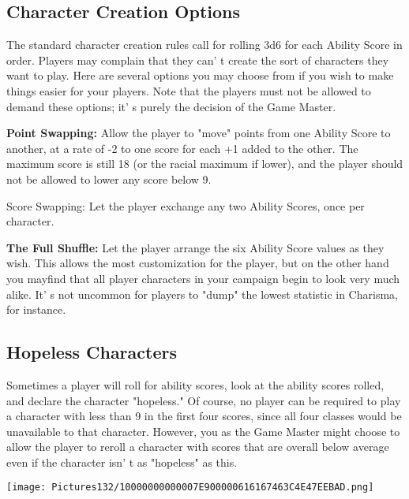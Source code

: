\documentclass[a4paper,twoside,openany,10pt]{book}
\begin{document}
\begin{multicols}{2}


\subsection{Character Creation Options}\label{character-creation-options}

The standard character creation rules call for rolling 3d6 for each Ability Score in order. Players may complain that they can' t create the sort of characters they want to play. Here are several options you may choose from if you wish to make things easier for your players. Note that the players must not be allowed to demand these options; it' s purely the decision of the Game Master.

\textbf{Point Swapping:} Allow the player to "move" points from one Ability Score to another, at a rate of -2 to one score for each +1 added to the other. The maximum score is still 18 (or the racial maximum if lower), and the player should not be allowed to lower any score below 9. 

Score Swapping: Let the player exchange any two Ability Scores, once per character.

\textbf{The Full Shuffle:} Let the player arrange the six Ability Score values as they wish. This allows the most customization for the player, but on the other hand you mayfind that all player characters in your  campaign begin to look very much alike. It' s not uncommon for players to "dump" the lowest statistic in Charisma, for instance.

\subsection{Hopeless Characters}\label{hopeless-characters}

Sometimes a player will roll for ability scores, look at the ability scores rolled, and declare the character "hopeless." Of course, no player can be required to play a character with less than 9 in the first four scores, since all four classes would be unavailable to that character. However, you as the Game Master might choose to allow the player to reroll a character with scores that are overall below average even if the character isn' t as "hopeless" as this.

\begin{center}

\texttt{[image: Pictures132/10000000000007E900000616167463C4E47EEBAD.png]}  
\end{center}


\end{multicols}
\end{document}
